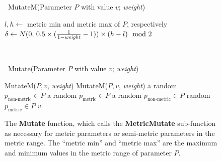 \documentclass{article}
\begin{document}
{\begin{figure}[t]
\begin{minipage}{\linewidth}
\begin{minipage}[t]{\linewidth}%
\begin{algorithm}[H]
   \caption{~MutateM(Parameter \(P\) with value \(v\); {\it weight})}
   \label{alg:example}
\begin{algorithmic}
\STATE \(l, h \leftarrow\) metric min and metric max of \(P\), respectively
\REPEAT
\STATE \(\delta \leftarrow N(0,\, 0.5 \times (\frac{1}{1 - \text{\it weight}} - 1)) \times (h - l) \mod 2\)
  \end{algorithmic}
\end{algorithm}
\end{minipage}\\
\begin{minipage}[t]{\linewidth}
\begin{algorithm}[H]
   \caption{~Mutate(Parameter \(P\) with value \(v\); {\it weight})}
   \label{alg:mutate}
\begin{algorithmic}
    MutateM(\(P, v\), {\it weight})
   		 MutateM(\(P, v\), {\it weight})
		 a random  \(p_{\text{non-metric}} \in P\)
	\ENDIF
				 a random \(p_{\text{metric}} \in P\)
		    	\ELSE
	    			 a random  \(p_{\text{non-metric}} \in P\)
    			\ENDIF
		\ENDIF
			 random \(p_{\text{metric}}\!\in P\)
    \ENDIF
     \(v\)
  \end{algorithmic}
\end{algorithm}
\end{minipage}
\end{minipage}
\caption{The {\bf Mutate} function, which calls the {\bf MetricMutate} sub-function as necessary for metric parameters or semi-metric parameters in the metric range.  The ``metric min'' and ``metric max'' are the maximum and minimum values in the metric range of parameter \(P\). }
\label{mutate}
\end{figure}

}
\end{document}

